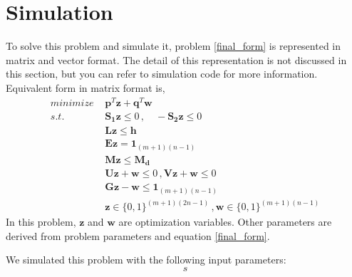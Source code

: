 \documentclass[lettersize,journal]{IEEEtran}
\begin{document}
\section{Simulation}
To solve this problem and simulate it, problem \ref{final_form} is represented in matrix and vector format. The detail of this representation is not discussed in this section, but you can refer to simulation code for more information. Equivalent form in matrix format is,
\begin{align}
\label{matrix_form}
minimize \, \, & \boldsymbol{p}^T \boldsymbol{z} + \boldsymbol{q}^T \boldsymbol{w} \\
s.t.  \, \, & \boldsymbol{S_1} \boldsymbol{z} \leq 0 \, , \quad -\boldsymbol{S_2} \boldsymbol{z} \leq 0 \nonumber \\
\quad & \boldsymbol{L}\boldsymbol{z} \leq \boldsymbol{h} \nonumber \\
\quad &  \boldsymbol{E} \boldsymbol{z} = \boldsymbol{1}_{(m+1)(n-1)}  \nonumber \\
\quad &  \boldsymbol{M} \boldsymbol{z} \leq \boldsymbol{M_d} \nonumber \\
\quad &  \boldsymbol{U} \boldsymbol{z} + \boldsymbol{w} \leq 0 \, , \boldsymbol{V} \boldsymbol{z} + \boldsymbol{w} \leq 0 \nonumber \\
\quad &  \boldsymbol{G} \boldsymbol{z} - \boldsymbol{w} \leq \boldsymbol{1}_{(m+1)(n-1)} \nonumber \\
\quad &  \boldsymbol{z} \in \{0, 1\}^{(m+1)(2n-1)} \, , \boldsymbol{w} \in \{0, 1\}^{(m+1)(n-1)} \nonumber
\end{align}
In this problem, $\boldsymbol{z}$ and $\boldsymbol{w}$ are optimization variables. Other parameters are derived from problem parameters and equation \ref{final_form}. 

We simulated this problem with the following input parameters:
\begin{equation}
s
\end{equation}
\end{document}

